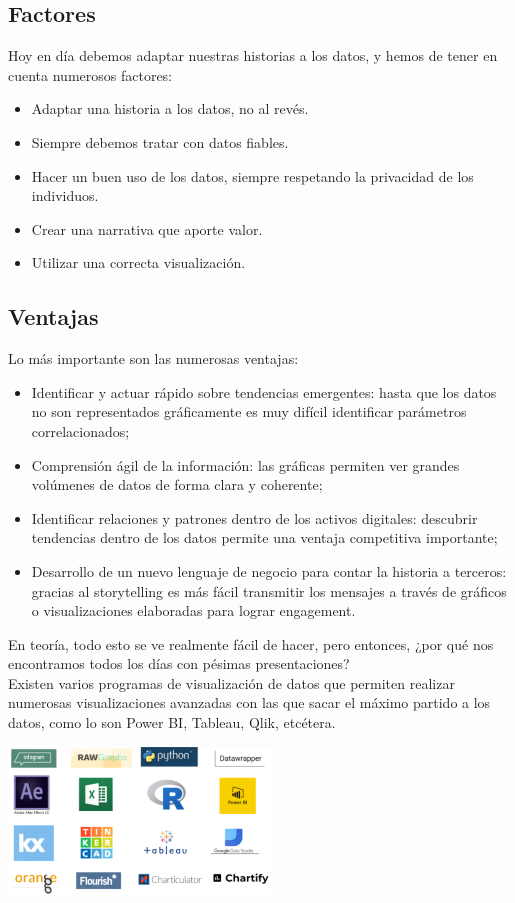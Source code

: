 \documentclass[twoside,twocolumn]{article}
\begin{document}
\subsection{Factores}
Hoy en día debemos adaptar nuestras historias a los datos, y hemos de tener en cuenta numerosos factores:
\begin{itemize}
    \item Adaptar una historia a los datos, no al revés.
    \item Siempre debemos tratar con datos fiables.
    \item Hacer un buen uso de los datos, siempre respetando la privacidad de los individuos.
    \item Crear una narrativa que aporte valor.
    \item Utilizar una correcta visualización.
\end{itemize}

\subsection{Ventajas}
Lo más importante son las numerosas ventajas:
\begin{itemize}
    \item Identificar y actuar rápido sobre tendencias emergentes: hasta que los datos no son representados gráficamente es muy difícil identificar parámetros correlacionados;
    \item Comprensión ágil de la información: las gráficas permiten ver grandes volúmenes de datos de forma clara y coherente;
    \item Identificar relaciones y patrones dentro de los activos digitales: descubrir tendencias dentro de los datos permite una ventaja competitiva importante;
    \item Desarrollo de un nuevo lenguaje de negocio para contar la historia a terceros: gracias al storytelling es más fácil transmitir los mensajes a través de gráficos o visualizaciones elaboradas para lograr engagement.
\end{itemize}
En teoría, todo esto se ve realmente fácil de hacer, pero entonces, ¿por qué nos encontramos todos los días con pésimas presentaciones?\\[0.1in]
Existen varios programas de visualización de datos que permiten realizar numerosas visualizaciones avanzadas con las que sacar el máximo partido a los datos, como lo son Power BI, Tableau, Qlik, etcétera.
\begin{center}
    \includegraphics[width=7cm]{./img/img2.png}
\end{center}
\end{document}
